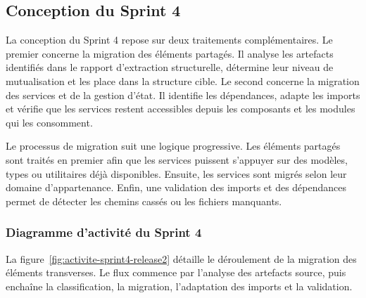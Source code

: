 \subsection{Conception du Sprint 4}

La conception du Sprint 4 repose sur deux traitements complémentaires. Le premier concerne la migration des éléments partagés. Il analyse les artefacts identifiés dans le rapport d'extraction structurelle, détermine leur niveau de mutualisation et les place dans la structure cible. Le second concerne la migration des services et de la gestion d'état. Il identifie les dépendances, adapte les imports et vérifie que les services restent accessibles depuis les composants et les modules qui les consomment.

Le processus de migration suit une logique progressive. Les éléments partagés sont traités en premier afin que les services puissent s'appuyer sur des modèles, types ou utilitaires déjà disponibles. Ensuite, les services sont migrés selon leur domaine d'appartenance. Enfin, une validation des imports et des dépendances permet de détecter les chemins cassés ou les fichiers manquants.



\subsubsection{Diagramme d'activité du Sprint 4}

La figure~\ref{fig:activite-sprint4-release2} détaille le déroulement de la migration des éléments transverses. Le flux commence par l'analyse des artefacts source, puis enchaîne la classification, la migration, l'adaptation des imports et la validation.

